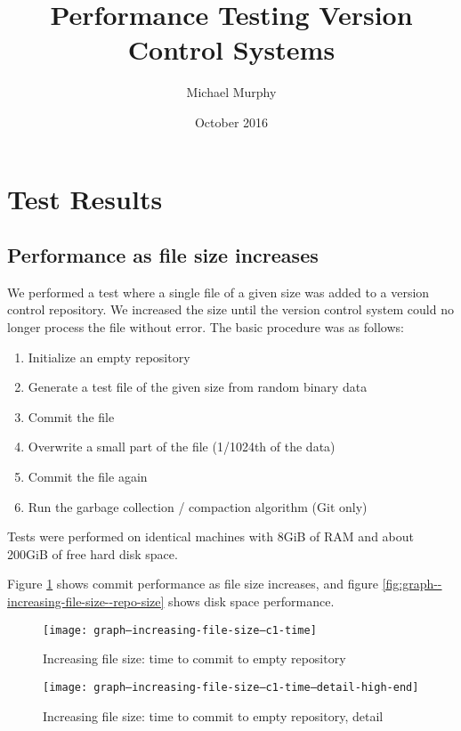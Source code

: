 \documentclass[a4paper]{article}
\begin{document}
\title{Performance Testing Version Control Systems}
\author{Michael Murphy}
\date{October 2016}
\maketitle

\section{Test Results}

\subsection{Performance as file size increases}

We performed a test where a single file of a given size was added to a version
control repository. We increased the size until the version control system could
no longer process the file without error. The basic procedure was as follows:

\begin{enumerate}
    \setlength{\itemsep}{0pt}
    \setlength{\parskip}{0pt}
    \setlength{\parsep}{0pt}
    \item Initialize an empty repository
    \item Generate a test file of the given size from random binary data
    \item Commit the file
    \item Overwrite a small part of the file (1/1024th of the data)
    \item Commit the file again
    \item Run the garbage collection / compaction algorithm (Git only)
\end{enumerate}

Tests were performed on identical machines with 8GiB of RAM and about 200GiB of
free hard disk space.

Figure \ref{fig:graph--increasing-file-size--c1-time} shows commit performance
as file size increases, and figure
\ref{fig:graph--increasing-file-size--repo-size} shows disk space performance.

\begin{figure}[h]
  \caption{Increasing file size: time to commit to empty repository}
  \label{fig:graph--increasing-file-size--c1-time}
  \centering
    \texttt{[image: graph--increasing-file-size--c1-time]}
\end{figure}

\begin{figure}[h]
  \caption{Increasing file size: time to commit to empty repository, detail}
  \label{fig:graph--increasing-file-size--c1-time--detail-high-end}
  \centering
    \texttt{[image: graph--increasing-file-size--c1-time--detail-high-end]}
\end{figure}
\end{document}
